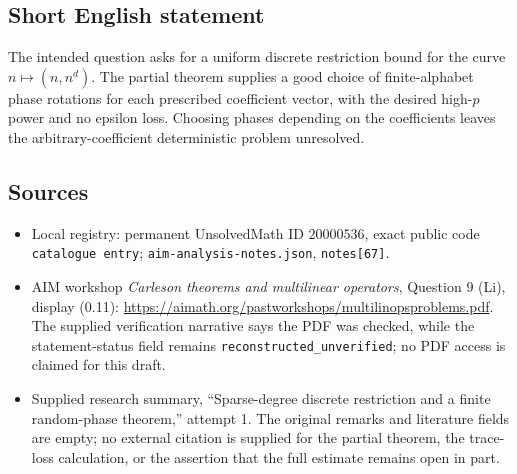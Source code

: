 \documentclass[11pt]{article}
\begin{document}
\subsection{Short English statement}
The intended question asks for a uniform discrete restriction bound for the curve \(n\mapsto(n,n^d)\). The partial theorem supplies a good choice of finite-alphabet phase rotations for each prescribed coefficient vector, with the desired high-\(p\) power and no epsilon loss. Choosing phases depending on the coefficients leaves the arbitrary-coefficient deterministic problem unresolved.
\subsection{Sources}
\begin{itemize}
\item Local registry: permanent UnsolvedMath ID \(20000536\), exact public code \texttt{catalogue entry}; \texttt{aim-analysis-notes.json}, \texttt{notes[67]}.
\item AIM workshop \emph{Carleson theorems and multilinear operators}, Question 9 (Li), display (0.11): \url{https://aimath.org/pastworkshops/multilinopsproblems.pdf}. The supplied verification narrative says the PDF was checked, while the statement-status field remains \texttt{reconstructed\_unverified}; no PDF access is claimed for this draft.
\item Supplied research summary, ``Sparse-degree discrete restriction and a finite random-phase theorem,'' attempt 1. The original remarks and literature fields are empty; no external citation is supplied for the partial theorem, the trace-loss calculation, or the assertion that the full estimate remains open in part.
\end{itemize}
\end{document}
